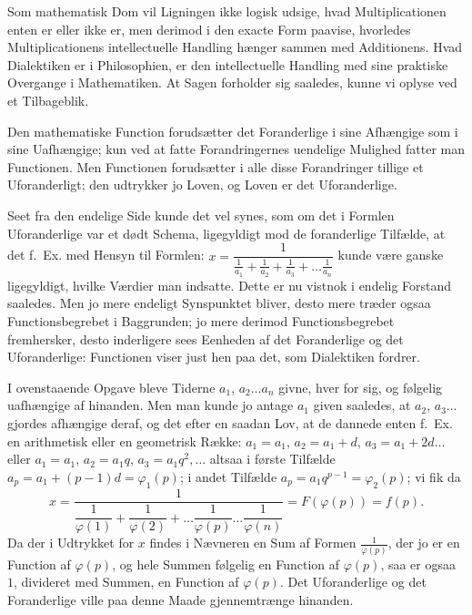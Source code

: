 \documentclass[12pt]{book}
\newcommand{\opage}[1]{\marginnote{\footnotesize\textit{[#1]}}}
\begin{document}
Som mathematisk Dom vil Ligningen ikke logisk udsige, hvad Multiplicationen enten
er eller ikke er, men derimod i den exacte Form paavise, hvorledes
Multiplicationens intellectuelle Handling hænger sammen med Additionens.
\opage{17} Hvad Dialektiken er i Philosophien, er den intellectuelle Handling med sine
praktiske Overgange i Mathematiken. At Sagen forholder sig saaledes, kunne vi
oplyse ved et Tilbageblik.

Den mathematiske Function forudsætter det Foranderlige i sine Afhængige som i
sine Uafhængige; kun ved at fatte Forandringernes uendelige Mulighed fatter man
Functionen. Men Functionen forudsætter i alle disse Forandringer tillige et
Uforanderligt; den udtrykker jo Loven, og Loven er det Uforanderlige.

Seet fra den endelige Side kunde det vel synes, som om det i Formlen
Uforanderlige var et dødt Schema, ligegyldigt mod de foranderlige Tilfælde, at
det f.\ Ex. med Hensyn til Formlen: $x = \dfrac{1}{\frac{1}{a_1}+\frac{1}{a_2}
+\frac{1}{a_3}+\dots\frac{1}{a_n}}$ kunde være ganske ligegyldigt, hvilke Værdier
man indsatte. Dette er nu vistnok i endelig Forstand saaledes. Men jo mere
endeligt Synspunktet bliver, desto mere træder ogsaa Functionsbegrebet i
Baggrunden; jo mere derimod Functionsbegrebet fremhersker, desto inderligere sees
Eenheden af det Foranderlige og det Uforanderlige: Functionen viser just hen paa
det, som Dialektiken fordrer.

I ovenstaaende Opgave bleve Tiderne $a_1$, $a_2\dots a_n$ givne, hver for sig, og
følgelig uafhængige af hinanden. Men man kunde jo antage $a_1$ given saaledes, at
$a_2$, $a_3\dots$ gjordes afhængige deraf, og det efter en saadan Lov, at de
dannede enten f.\ Ex. en arithmetisk eller en geometrisk Række: $a_1 = a_1$,
$a_2 = a_1 + d$, $a_3 = a_1 + 2d\dots$ eller $a_1 = a_1$, $a_2 = a_1 q$,
$a_3 = a_1 q^{2},\dots$ altsaa i første Tilfælde $a_p = a_1 + (p-1)d =
\varphi_1(p)$; i andet Tilfælde $a_p = a_1 q^{p-1} = \varphi_2(p)$; vi fik da
\[
x = \frac{1}{\dfrac{1}{\varphi(1)}+\dfrac{1}{\varphi(2)}+\dots\dfrac{1}{\varphi(p)}
\dots\dfrac{1}{\varphi(n)}} = F(\varphi(p)) = f(p).
\]
\opage{18} Da der i Udtrykket for $x$ findes i Nævneren en Sum af Formen $\frac{1}{\varphi(p)}$,
der jo er en Function af $\varphi(p)$, og hele Summen følgelig en Function af
$\varphi(p)$, saa er ogsaa $1$, divideret med Summen, en Function af
$\varphi(p)$. Det Uforanderlige og det Foranderlige ville paa denne Maade
gjennemtrænge hinanden.
\end{document}

